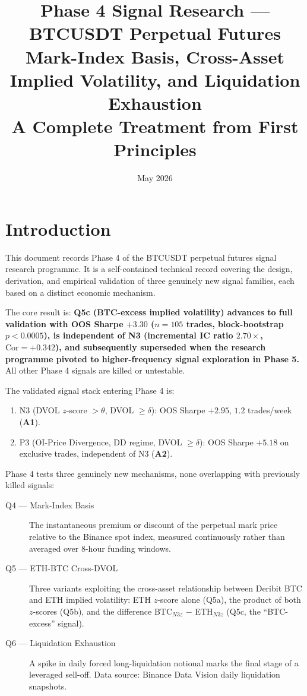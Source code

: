 \documentclass[12pt, a4paper]{article}
\title{\textbf{Phase 4 Signal Research --- BTCUSDT Perpetual Futures}\\[0.4em]
\large Mark-Index Basis, Cross-Asset Implied Volatility, and Liquidation Exhaustion\\[0.3em]
\large A Complete Treatment from First Principles}
\author{}
\date{May 2026}
\theoremstyle{plain}
\theoremstyle{definition}
\newcommand{\Cor}{\mathrm{Cor}}
\begin{document}
\maketitle
\tableofcontents
\newpage

\section{Introduction}

This document records Phase 4 of the BTCUSDT perpetual futures signal
research programme.  It is a self-contained technical record covering
the design, derivation, and empirical validation of three genuinely new
signal families, each based on a distinct economic mechanism.

The core result is: \textbf{Q5c (BTC-excess implied volatility) advances
to full validation with OOS Sharpe $+3.30$ ($n = 105$ trades,
block-bootstrap $p < 0.0005$), is independent of N3 (incremental IC
ratio $2.70\times$, $\Cor = +0.342$), and subsequently superseded when
the research programme pivoted to higher-frequency signal exploration
in Phase 5.}  All other Phase 4 signals are killed or untestable.

The validated signal stack entering Phase 4 is:
\begin{enumerate}
  \item N3 (DVOL $z$-score $> \theta$, DVOL $\geq \delta$): OOS Sharpe $+2.95$,
        $1.2$ trades/week (\textbf{A1}).
  \item P3 (OI-Price Divergence, DD regime, DVOL $\geq \delta$): OOS Sharpe $+5.18$
        on exclusive trades, independent of N3 (\textbf{A2}).
\end{enumerate}

Phase 4 tests three genuinely new mechanisms, none overlapping with
previously killed signals:

\begin{description}
  \item[Q4 --- Mark-Index Basis]
        The instantaneous premium or discount of the perpetual mark price
        relative to the Binance spot index, measured continuously rather
        than averaged over 8-hour funding windows.

  \item[Q5 --- ETH-BTC Cross-DVOL]
        Three variants exploiting the cross-asset relationship between
        Deribit BTC and ETH implied volatility: ETH $z$-score alone (Q5a),
        the product of both $z$-scores (Q5b), and the difference
        BTC$_{N3z}$ $-$ ETH$_{N3z}$ (Q5c, the ``BTC-excess'' signal).

  \item[Q6 --- Liquidation Exhaustion]
        A spike in daily forced long-liquidation notional marks the
        final stage of a leveraged sell-off.  Data source: Binance Data
        Vision daily liquidation snapshots.
\end{description}
\end{document}
